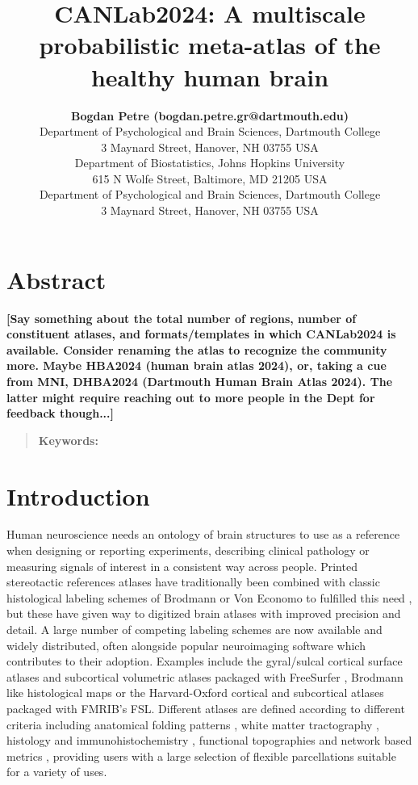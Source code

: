 \documentclass[10pt,letterpaper]{article}
\title{CANLab2024: A multiscale probabilistic meta-atlas of the healthy human brain}
\author{{\large \bf Bogdan Petre (bogdan.petre.gr@dartmouth.edu)} \\
  Department of Psychological and Brain Sciences, Dartmouth College \\
  3 Maynard Street, Hanover, NH 03755 USA
\AND {\large \bf Martin A Lindquist (mlindqui@jhsph.edu)} \\
  Department of Biostatistics, Johns Hopkins University \\
  615 N Wolfe Street, Baltimore, MD 21205 USA
\AND {\large \bf Tor D Wager (tor.d.wager@dartmouth.edu)} \\
  Department of Psychological and Brain Sciences, Dartmouth College \\
  3 Maynard Street, Hanover, NH 03755 USA}
\begin{document}
\maketitle

\section{Abstract}
{
\bf
[Say something about the total number of regions, number of constituent atlases, and formats/templates in which CANLab2024 is available. Consider renaming the atlas to recognize the community more. Maybe HBA2024 (human brain atlas 2024), or, taking a cue from MNI, DHBA2024 (Dartmouth Human Brain Atlas 2024). The latter might require reaching out to more people in the Dept for feedback though...]
}
\begin{quote}
\small
\textbf{Keywords:}
\end{quote}

\section{Introduction}
Human neuroscience needs an ontology of brain structures to use as a reference when designing or reporting experiments, describing clinical pathology or measuring signals of interest in a consistent way across people. Printed stereotactic references atlases have traditionally been combined with classic histological labeling schemes of Brodmann or Von Economo to fulfilled this need \cite{mai2008atlas, talairach1988co}, but these have given way to digitized brain atlases with improved precision and detail. A large number of competing labeling schemes are now available and widely distributed, often alongside popular neuroimaging software which contributes to their adoption. Examples include the gyral/sulcal cortical surface atlases and subcortical volumetric atlases packaged with FreeSurfer , Brodmann like histological maps  or the Harvard-Oxford cortical and subcortical atlases packaged with FMRIB's FSL. Different atlases are defined according to different criteria including anatomical folding patterns , white matter tractography , histology and immunohistochemistry , functional topographies  and network based metrics , providing users with a large selection of flexible parcellations suitable for a variety of uses.
\end{document}
